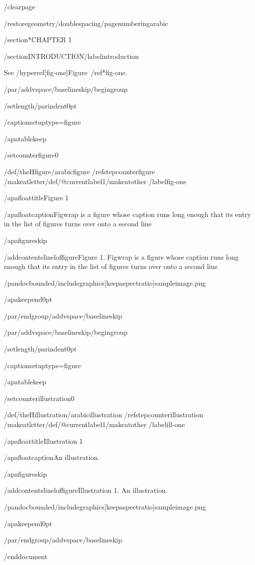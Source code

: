 /clearpage

/restoregeometry/doublespacing/pagenumbering{arabic}

/section*{CHAPTER 1}

/section{INTRODUCTION}/label{introduction}

See /hyperref[fig-one]{Figure~/ref*{fig-one}}.

/par/addvspace{/baselineskip}/begingroup

/setlength{/parindent}{0pt}

/captionsetup{type=figure}

/apatablekeep

/setcounter{figure}{0}

/def/theHfigure{/arabic{figure}}%
/refstepcounter{figure}%
/makeatletter/def/@currentlabel{1}/makeatother%
/label{fig-one}

/apafloattitle{Figure 1}

/apafloatcaption{Figwrap is a figure whose caption runs long enough that
its entry in the list of figures turns over onto a second line}

/apafigureskip

/addcontentsline{lof}{figure}{Figure 1. Figwrap is a figure whose
caption runs long enough that its entry in the list of figures turns
over onto a second line}

/pandocbounded{/includegraphics[keepaspectratio]{sampleimage.png}}

/apakeepend{0pt}

/par/endgroup/addvspace{/baselineskip}

/par/addvspace{/baselineskip}/begingroup

/setlength{/parindent}{0pt}

/captionsetup{type=figure}

/apatablekeep

/setcounter{illustration}{0}

/def/theHillustration{/arabic{illustration}}%
/refstepcounter{illustration}%
/makeatletter/def/@currentlabel{1}/makeatother%
/label{ill-one}

/apafloattitle{Illustration 1}

/apafloatcaption{An illustration.}

/apafigureskip

/addcontentsline{lof}{figure}{Illustration 1. An illustration.}

/pandocbounded{/includegraphics[keepaspectratio]{sampleimage.png}}

/apakeepend{0pt}

/par/endgroup/addvspace{/baselineskip}




/end{document}

